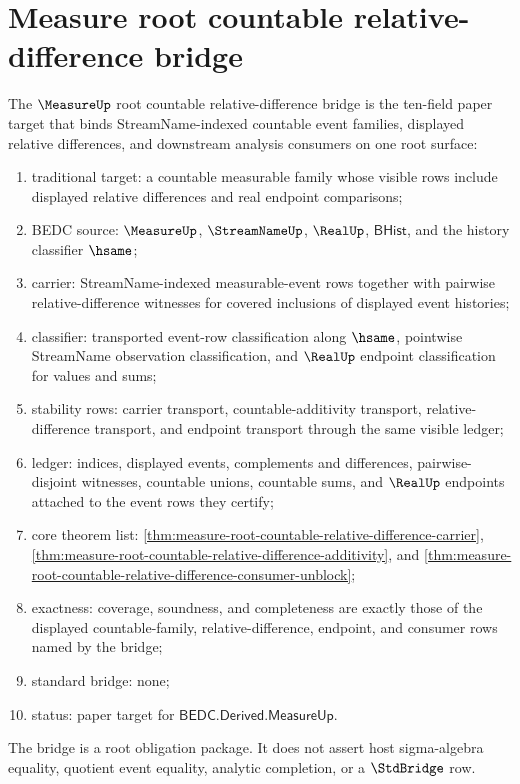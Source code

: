 \section{Measure root countable relative-difference bridge}
\label{sec:measure-root-countable-relative-difference-bridge}

\begin{definition}
\label{def:measure-root-countable-relative-difference-bridge}
The $\MeasureUp$ root countable relative-difference bridge is the ten-field
paper target that binds StreamName-indexed countable event families, displayed
relative differences, and downstream analysis consumers on one root surface:
\begin{enumerate}
  \item traditional target: a countable measurable family whose visible rows
  include displayed relative differences and real endpoint comparisons;
  \item BEDC source: $\MeasureUp$, $\StreamNameUp$, $\RealUp$,
  $\mathsf{BHist}$, and the history classifier $\hsame$;
  \item carrier: StreamName-indexed measurable-event rows together with
  pairwise relative-difference witnesses for covered inclusions of displayed
  event histories;
  \item classifier: transported event-row classification along $\hsame$,
  pointwise StreamName observation classification, and $\RealUp$ endpoint
  classification for values and sums;
  \item stability rows: carrier transport, countable-additivity transport,
  relative-difference transport, and endpoint transport through the same
  visible ledger;
  \item ledger: indices, displayed events, complements and differences,
  pairwise-disjoint witnesses, countable unions, countable sums, and
  $\RealUp$ endpoints attached to the event rows they certify;
  \item core theorem list:
  \autoref{thm:measure-root-countable-relative-difference-carrier},
  \autoref{thm:measure-root-countable-relative-difference-additivity}, and
  \autoref{thm:measure-root-countable-relative-difference-consumer-unblock};
  \item exactness: coverage, soundness, and completeness are exactly those of
  the displayed countable-family, relative-difference, endpoint, and consumer
  rows named by the bridge;
  \item standard bridge: none;
  \item status: paper target for $\mathsf{BEDC.Derived.MeasureUp}$.
\end{enumerate}
The bridge is a root obligation package. It does not assert host
sigma-algebra equality, quotient event equality, analytic completion, or a
$\StdBridge$ row.
\end{definition}

